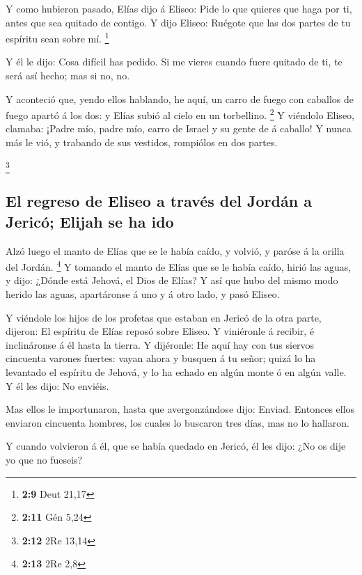  Y como hubieron pasado, Elías dijo á Eliseo: Pide lo que
quieres que haga por ti, antes que sea quitado de contigo. Y dijo
Eliseo: Ruégote que las dos partes de tu espíritu sean sobre mí.
\footnote{\textbf{2:9} Deut 21,17}

 Y él le dijo: Cosa difícil has pedido. Si me vieres cuando
fuere quitado de ti, te será así hecho; mas si no, no.

 Y aconteció que, yendo ellos hablando, he aquí, un carro
de fuego con caballos de fuego apartó á los dos: y Elías subió al cielo
en un torbellino. \footnote{\textbf{2:11} Gén 5,24}  Y
viéndolo Eliseo, clamaba: ¡Padre mío, padre mío, carro de Israel y su
gente de á caballo! Y nunca más le vió, y trabando de sus vestidos,
rompiólos en dos partes.

\footnote{\textbf{2:12} 2Re 13,14}

\hypertarget{el-regreso-de-eliseo-a-travuxe9s-del-jorduxe1n-a-jericuxf3-elijah-se-ha-ido}{%
\subsection{El regreso de Eliseo a través del Jordán a Jericó; Elijah se
ha
ido}\label{el-regreso-de-eliseo-a-travuxe9s-del-jorduxe1n-a-jericuxf3-elijah-se-ha-ido}}

 Alzó luego el manto de Elías que se le había caído, y
volvió, y paróse á la orilla del Jordán. \footnote{\textbf{2:13} 2Re 2,8}
 Y tomando el manto de Elías que se le había caído, hirió
las aguas, y dijo: ¿Dónde está Jehová, el Dios de Elías? Y así que hubo
del mismo modo herido las aguas, apartáronse á uno y á otro lado, y pasó
Eliseo.

 Y viéndole los hijos de los profetas que estaban en Jericó
de la otra parte, dijeron: El espíritu de Elías reposó sobre Eliseo. Y
viniéronle á recibir, é inclináronse á él hasta la tierra. 
Y dijéronle: He aquí hay con tus siervos cincuenta varones fuertes:
vayan ahora y busquen á tu señor; quizá lo ha levantado el espíritu de
Jehová, y lo ha echado en algún monte ó en algún valle. Y él les dijo:
No enviéis.

 Mas ellos le importunaron, hasta que avergonzándose dijo:
Enviad. Entonces ellos enviaron cincuenta hombres, los cuales lo
buscaron tres días, mas no lo hallaron.

 Y cuando volvieron á él, que se había quedado en Jericó,
él les dijo: ¿No os dije yo que no fueseis?

